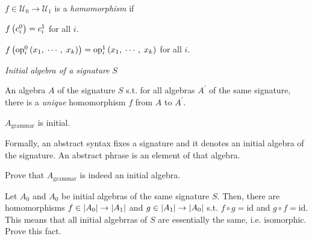 \begin{enumcirc}
    $f \in \mathcal{U}_0 \rightarrow \mathcal{U}_1$ is a \emph{homomorphism} if
    \begin{enumrm}
      \item $f \left( c_i^0 \right) = c_i^1$ for all $i$.
      \item $f \left( \textrm{op}_i^0 \left( x_1,\; \cdots ,\; x_k \right) \right) =
        \textrm{op}_i^1 \left( x_1,\; \cdots ,\; x_k \right)$ for all $i$.
    \end{enumrm}

  \item
    \emph{Initial algebra of a signature} $S$
    \begin{enumrm}
      \item
        An algebra $A$ of the signature $S$ s.t. for all algebras $A^\prime$ of
        the same signature, there is a \emph{unique} homomorphism $f$ from $A$
        to $A^\prime$.
      \item
        $A_{\textrm{grammar}}$ is initial.
      \item
        Formally, an abstract syntax fixes a signature and it denotes an initial
        algebra of the signature. An abstract phrase is an element of that
        algebra.
    \end{enumrm}
    \begin{exercise}
      Prove that $A_{\textrm{grammar}}$ is indeed an initial algebra.
    \end{exercise}
    \begin{exercise}
      Let $A_0$ and $A_0$ be initial algebras of the same signature $S$. Then,
      there are homomorphisms $f \in \left\vert A_0 \right\vert \rightarrow \left\vert A_1 \right\vert$ and
      $g \in \left\vert A_1 \right\vert \rightarrow \left\vert A_0 \right\vert$ s.t. $f \circ g = \textrm{id}$ and
      $g \circ f = \textrm{id}$.\\
      This means that all initial algebrras of $S$ are essentially the same,
      i.e. isomorphic. Prove this fact.
    \end{exercise}

\end{enumcirc}


